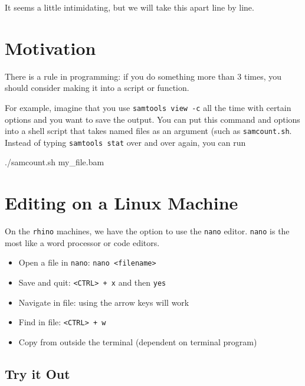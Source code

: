 \documentclass[
  letterpaper,
  DIV=11,
  numbers=noendperiod]{scrreprt}
\newenvironment{Shaded}{\begin{snugshade}}{\end{snugshade}}
\newcommand{\ExtensionTok}[1]{\textcolor[rgb]{0.00,0.23,0.31}{#1}}
\newcommand{\NormalTok}[1]{\textcolor[rgb]{0.00,0.23,0.31}{#1}}
\providecommand{\tightlist}{%
  \setlength{\itemsep}{0pt}\setlength{\parskip}{0pt}}
\begin{document}
It seems a little intimidating, but we will take this apart line by
line.

\section{Motivation}\label{motivation}

There is a rule in programming: if you do something more than 3 times,
you should consider making it into a script or function.

For example, imagine that you use \texttt{samtools\ view\ -c} all the
time with certain options and you want to save the output. You can put
this command and options into a shell script that takes named files as
an argument (such as \texttt{samcount.sh}. Instead of typing
\texttt{samtools\ stat} over and over again, you can run

\begin{Shaded}
\begin{Highlighting}[]
\ExtensionTok{./samcount.sh}\NormalTok{ my\_file.bam}
\end{Highlighting}
\end{Shaded}

\section{Editing on a Linux Machine}\label{editing-on-a-linux-machine}

On the \texttt{rhino} machines, we have the option to use the
\texttt{nano} editor. \texttt{nano} is the most like a word processor or
code editors.

\begin{itemize}
\tightlist
\item
  Open a file in \texttt{nano}:
  \texttt{nano\ \textless{}filename\textgreater{}}
\item
  Save and quit: \texttt{\textless{}CTRL\textgreater{}\ +\ x} and then
  \texttt{yes}
\item
  Navigate in file: using the arrow keys will work
\item
  Find in file: \texttt{\textless{}CTRL\textgreater{}\ +\ w}
\item
  Copy from outside the terminal (dependent on terminal program)
\end{itemize}

\subsection{Try it Out}\label{try-it-out-3}
\end{document}
